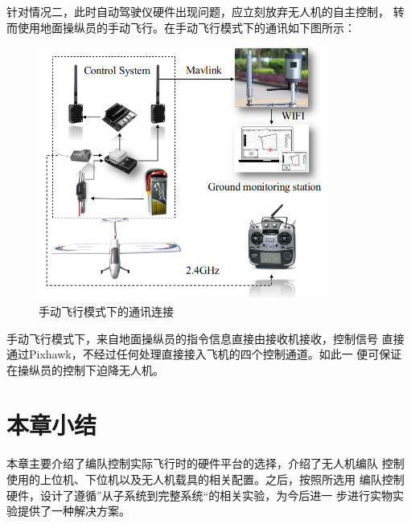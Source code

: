 针对情况二，此时自动驾驶仪硬件出现问题，应立刻放弃无人机的自主控制，
转而使用地面操纵员的手动飞行。在手动飞行模式下的通讯如下图所示：
\begin{figure}[H]
    \centering
    \includegraphics[width=0.85\textwidth]{figures/adds/protected_arch}
    \caption{手动飞行模式下的通讯连接}\label{fig:c5-protected_arch}
\end{figure}
手动飞行模式下，来自地面操纵员的指令信息直接由接收机接收，控制信号
直接通过Pixhawk，不经过任何处理直接接入飞机的四个控制通道。如此一
便可保证在操纵员的控制下迫降无人机。
\section{本章小结}
本章主要介绍了编队控制实际飞行时的硬件平台的选择，介绍了无人机编队
控制使用的上位机、下位机以及无人机载具的相关配置。之后，按照所选用
编队控制硬件，设计了遵循”从子系统到完整系统“的相关实验，为今后进一
步进行实物实验提供了一种解决方案。
